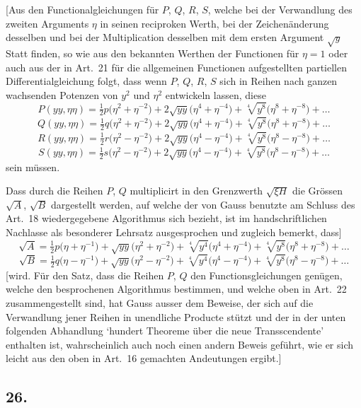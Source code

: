 \documentclass[10pt,a4paper]{article}
\begin{document}
[Aus den Functionalgleichungen für $P$, $Q$, $R$, $S$, welche bei der Verwandlung des zweiten Arguments $\eta$ in seinen reciproken Werth, bei der Zeichenänderung desselben und bei der Multiplication desselben mit dem ersten Argument
$\sqrt{y}$ Statt finden, so wie aus den bekannten Werthen der Functionen für $\eta=1$
oder auch aus der in Art.~21 für die allgemeinen Functionen aufgestellten partiellen Differentialgleichung folgt, dass wenn $P$, $Q$, $R$, $S$ sich in Reihen nach
ganzen wachsenden Potenzen von $y^2$ und $\eta^2$ entwickeln lassen, diese
\[
P(yy,\eta\eta) = \tfrac12 p\bigl(\eta^2+\eta^{-2}\bigr) + 2\sqrt{yy}\bigl(\eta^4+\eta^{-4}\bigr) + \sqrt[4]{y^8}\bigl(\eta^8+\eta^{-8}\bigr) + \ldots
\]
\[
Q(yy,\eta\eta) = \tfrac12 q\bigl(\eta^2+\eta^{-2}\bigr) + 2\sqrt{yy}\bigl(\eta^4+\eta^{-4}\bigr) + \sqrt[4]{y^8}\bigl(\eta^8+\eta^{-8}\bigr) + \ldots
\]
\[
R(yy,\eta\eta) = \tfrac12 r\bigl(\eta^2-\eta^{-2}\bigr) + 2\sqrt{yy}\bigl(\eta^4-\eta^{-4}\bigr) + \sqrt[4]{y^8}\bigl(\eta^8-\eta^{-8}\bigr) + \ldots
\]
\[
S(yy,\eta\eta) = \tfrac12 s\bigl(\eta^2-\eta^{-2}\bigr) + 2\sqrt{yy}\bigl(\eta^4-\eta^{-4}\bigr) + \sqrt[4]{y^8}\bigl(\eta^8-\eta^{-8}\bigr) + \ldots
\]
sein müssen.

Dass durch die Reihen $P$, $Q$ multiplicirt in den Grenzwerth $\sqrt{\xi H}$ die Grössen
$\sqrt{A}$, $\sqrt{B}$ dargestellt werden, auf welche der von Gauss benutzte am Schluss des
Art.~18 wiedergegebene Algorithmus sich bezieht, ist im handschriftlichen Nachlasse als besonderer Lehrsatz ausgesprochen und zugleich bemerkt, dass]
\[
\sqrt{A} = \tfrac12 p\bigl(\eta+\eta^{-1}\bigr) + \sqrt{yy}\bigl(\eta^2+\eta^{-2}\bigr) + \sqrt[4]{y^4}\bigl(\eta^4+\eta^{-4}\bigr) + \sqrt[4]{y^8}\bigl(\eta^8+\eta^{-8}\bigr) + \ldots
\]
\[
\sqrt{B} = \tfrac12 q\bigl(\eta-\eta^{-1}\bigr) + \sqrt{yy}\bigl(\eta^2-\eta^{-2}\bigr) + \sqrt[4]{y^4}\bigl(\eta^4-\eta^{-4}\bigr) + \sqrt[4]{y^8}\bigl(\eta^8-\eta^{-8}\bigr) + \ldots
\]
[wird. Für den Satz, dass die Reihen $P$, $Q$ den Functionsgleichungen genügen,
welche den besprochenen Algorithmus bestimmen, und welche oben in Art.~22
zusammengestellt sind, hat Gauss ausser dem Beweise, der sich auf die Verwandlung jener Reihen in unendliche Producte stützt und der in der unten folgenden Abhandlung `hundert Theoreme über die neue Transscendente' enthalten ist,
wahrscheinlich auch noch einen andern Beweis geführt, wie er sich leicht aus
den oben in Art.~16 gemachten Andeutungen ergibt.]


\subsection*{26.}
\end{document}
